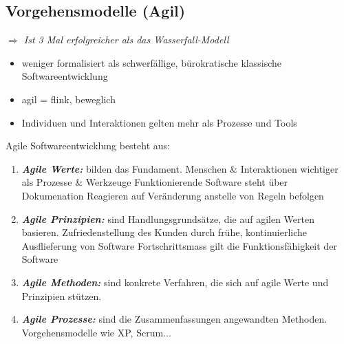 \subsection{Vorgehensmodelle (Agil)}
\textit{$\Rightarrow$ Ist 3 Mal erfolgreicher als das Wasserfall-Modell}
\begin{itemize}
	\item weniger formalisiert als schwerfällige, \newline
    bürokratische klassische Softwareentwicklung
	\item agil = flink, beweglich
	\item Individuen und Interaktionen gelten mehr als Prozesse und Tools
\end{itemize}
\vspace{0.5cm}
Agile Softwareentwicklung besteht aus:
\begin{enumerate}
	\item \textbf{\textit{Agile Werte:}} bilden das Fundament.\newline
	Menschen \& Interaktionen wichtiger als Prozesse \& Werkzeuge\newline
	Funktionierende Software steht über Dokumenation\newline
	Reagieren auf Veränderung anstelle von Regeln befolgen
	\item \textbf{\textit{Agile Prinzipien:}} sind Handlungsgrundsätze, die auf agilen Werten basieren.\newline
	Zufriedenstellung des Kunden durch frühe, kontinuierliche  Ausflieferung von Software\newline
	Fortschrittsmass gilt die Funktionsfähigkeit der Software
	\item \textbf{\textit{Agile Methoden:}} sind konkrete Verfahren, die sich auf agile Werte und Prinzipien stützen.
	\item \textbf{\textit{Agile Prozesse:}} sind die Zusammenfassungen angewandten Methoden.\newline
	Vorgehensmodelle wie XP, Scrum...
	\\ 
\end{enumerate}
\pagebreak
